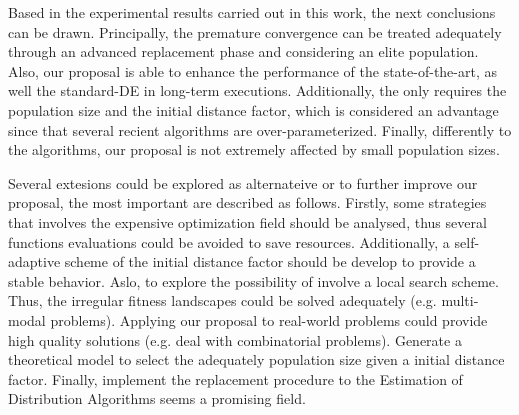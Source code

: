 Based in the experimental results carried out in this work, the next conclusions can be drawn.
%
Principally, the premature convergence can be treated adequately through an advanced replacement phase and considering an elite population.
%
Also, our proposal is able to enhance the performance of the state-of-the-art, as well the standard-DE in long-term executions.
%
Additionally, the \DEEDM{} only requires the population size and the initial distance factor, 
which is considered an advantage since that several recient algorithms are over-parameterized.
%
Finally, differently to the \DE{} algorithms, our proposal is not extremely affected by small population sizes.


Several extesions could be explored as alternateive or to further improve our proposal, the most important are described as follows.
%
Firstly, some strategies that involves the expensive optimization field should be analysed, thus several functions evaluations could be avoided to save resources.
%
Additionally, a self-adaptive scheme of the initial distance factor should be develop to provide a stable behavior.
%
Aslo, to explore the possibility of involve a local search scheme. 
%
Thus, the irregular fitness landscapes could be solved adequately (e.g. multi-modal problems).
%
Applying our proposal to real-world problems could provide high quality solutions (e.g. deal with combinatorial problems).
%
Generate a theoretical model to select the adequately population size given a initial distance factor.
%
Finally, implement the replacement procedure to the Estimation of Distribution Algorithms seems a promising field.
